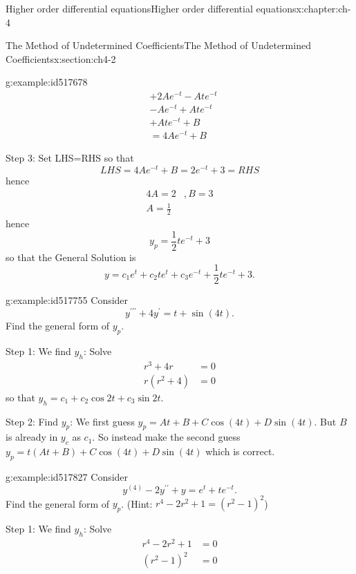 \documentclass[oneside,10pt,]{book}
\numberwithin{equation}{section}
\numberwithin{equation}{section}
\newcommand{\amp}{&}
\begin{document}
\begin{chapterptx}{Higher order differential equations}{}{Higher order differential equations}{}{}{x:chapter:ch-4}
\begin{sectionptx}{The Method of Undetermined Coefficients}{}{The Method of Undetermined Coefficients}{}{}{x:section:ch4-2}
\begin{example}{}{g:example:id517678}
\begin{align*}
\amp +2Ae^{-t}-Ate^{-t}\\
\amp -Ae^{-t}+Ate^{-t}\\
\amp +Ate^{-t}+B\\
\amp =4Ae^{-t}+B
\end{align*}
%
\par
Step 3: Set LHS=RHS so that%
\begin{equation*}
LHS=4Ae^{-t}+B=2e^{-t}+3=RHS
\end{equation*}
hence%
\begin{align*}
4A=2 \amp ,B=3\\
A=\frac{1}{2}
\end{align*}
hence%
\begin{equation*}
y_{p}=\frac{1}{2}te^{-t}+3
\end{equation*}
so that the General Solution is%
\begin{equation*}
y=c_{1}e^{t}+c_{2}te^{t}+c_{3}e^{-t}+\frac{1}{2}te^{-t}+3.
\end{equation*}
%
\end{example}
\begin{example}{}{g:example:id517755}%
Consider%
\begin{equation*}
y^{\prime\prime\prime}+4y^{\prime}=t+\sin(4t).
\end{equation*}
Find the general form of \(y_{p}\).%
\par
Step 1: We find \(y_{h}\): Solve%
\begin{align*}
r^{3}+4r \amp =0\\
r\left(r^{2}+4\right) \amp =0
\end{align*}
so that \(y_{h}=c_{1}+c_{2}\cos2t+c_{3}\sin2t\).%
\par
Step 2: Find \(y_{p}\): We first guess \(y_{p}=At+B+C\cos(4t)+D\sin(4t)\). But \(B\) is already in \(y_{c}\) as \(c_{1}\). So instead make the second guess \(y_{p}=t\left(At+B\right)+C\cos(4t)+D\sin(4t)\) which is correct.%
\end{example}
\begin{example}{}{g:example:id517827}%
Consider%
\begin{equation*}
y^{(4)}-2y^{\prime\prime}+y=e^{t}+te^{-t}.
\end{equation*}
Find the general form of \(y_{p}\). (Hint: \(r^{4}-2r^{2}+1=\left(r^{2}-1\right)^{2}\))%
\par
Step 1: We find \(y_{h}\): Solve%
\begin{align*}
r^{4}-2r^{2}+1 \amp =0\\
\left(r^{2}-1\right)^{2} \amp =0
\end{align*}

\end{example}
\end{sectionptx}
\end{chapterptx}
\end{document}
